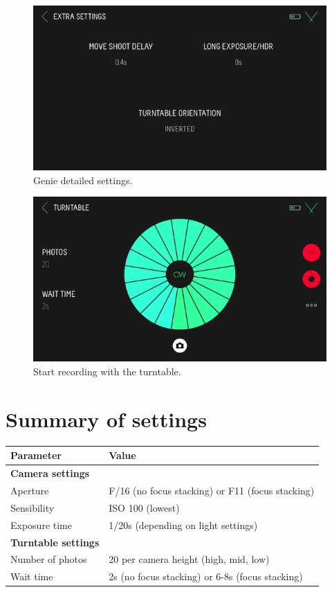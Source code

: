 \documentclass[
]{book}
\begin{document}
\begin{figure}

{\centering \includegraphics[width=0.5\linewidth]{Figures/genie_settings} 

}

\caption{Genie detailed settings.}\label{fig:genie-settings}
\end{figure}

\begin{figure}

{\centering \includegraphics[width=0.5\linewidth]{Figures/genie_turntable_20_1} 

}

\caption{Start recording with the turntable.}\label{fig:genie-record}
\end{figure}

\hypertarget{summary-of-settings}{%
\section{Summary of settings}\label{summary-of-settings}}

\begin{longtable}[]{@{}ll@{}}
\toprule()
\textbf{Parameter} & \textbf{Value} \\
\midrule()
\endhead
\textbf{Camera settings} & \\
Aperture & F/16 (no focus stacking) or F11 (focus stacking) \\
Sensibility & ISO 100 (lowest) \\
Exposure time & 1/20s (depending on light settings) \\
\textbf{Turntable settings} & \\
Number of photos & 20 per camera height (high, mid, low) \\
Wait time & 2s (no focus stacking) or 6-8s (focus stacking) \\
\bottomrule()
\end{longtable}
\end{document}

